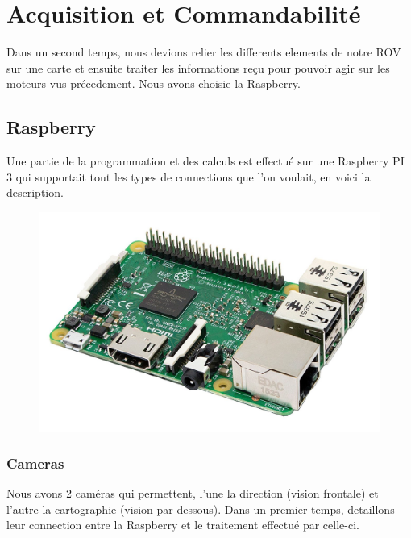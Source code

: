 \documentclass[a4paper,11pt]{report}
\begin{document}
	
\chapter{Acquisition et Commandabilité}
	
	Dans un second temps, nous devions relier les differents elements de notre ROV sur une carte et ensuite traiter les informations reçu pour pouvoir agir sur les moteurs vus précedement. Nous avons choisie la Raspberry.
	
	\section{Raspberry}
		Une partie de la programmation et des calculs est effectué sur une Raspberry PI 3 qui supportait tout les types de connections que l'on voulait, en voici la description.
			\begin{figure}[!h]
					\begin{center}
						\includegraphics[scale=0.2]{Photos/Raspberry.jpg}
					\end{center}
				\end{figure}
				
		\subsection{Cameras}
			Nous avons 2 caméras qui permettent, l'une la direction (vision frontale) et l'autre la cartographie (vision par dessous). Dans un premier temps, detaillons leur connection entre la Raspberry et le traitement effectué par celle-ci.
			
\end{document}
